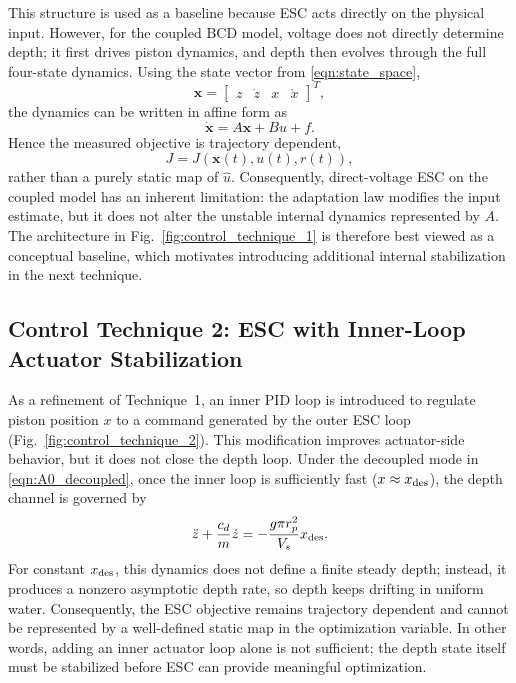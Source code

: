 ﻿\documentclass[subscriptcorrection,upint,varvw,barcolor=Goldenrod3,mathalfa=cal=euler,balance,hyphenate,french,pdf-a]{asmejour}
\begin{document}
This structure is used as a baseline because ESC acts directly on the physical input. However, for the coupled BCD model, voltage does not directly determine depth; it first drives piston dynamics, and depth then evolves through the full four-state dynamics. Using the state vector from \eqref{eqn:state_space},
\[
\mathbf{x}=\begin{bmatrix}z & \dot{z} & x & \dot{x}\end{bmatrix}^T,
\]
the dynamics can be written in affine form as
\[
\dot{\mathbf{x}}=A\mathbf{x}+Bu+f.
\]
Hence the measured objective is trajectory dependent,
\[
J=J(\mathbf{x}(t),u(t),r(t)),
\]
rather than a purely static map of $\hat{u}$. Consequently, direct-voltage ESC on the coupled model has an inherent limitation: the adaptation law modifies the input estimate, but it does not alter the unstable internal dynamics represented by $A$. The architecture in Fig.~\ref{fig:control_technique_1} is therefore best viewed as a conceptual baseline, which motivates introducing additional internal stabilization in the next technique.

\subsection{Control Technique 2: ESC with Inner-Loop Actuator Stabilization}
As a refinement of Technique~1, an inner PID loop is introduced to regulate piston position $x$ to a command generated by the outer ESC loop (Fig.~\ref{fig:control_technique_2}). This modification improves actuator-side behavior, but it does not close the depth loop. Under the decoupled mode in \eqref{eqn:A0_decoupled}, once the inner loop is sufficiently fast ($x\approx x_{\rm des}$), the depth channel is governed by
\[
\ddot{z}+\frac{c_d}{m}\dot{z}=-\frac{g\pi r_p^2}{V_s}x_{\rm des}.
\]
For constant $x_{\rm des}$, this dynamics does not define a finite steady depth; instead, it produces a nonzero asymptotic depth rate, so depth keeps drifting in uniform water. Consequently, the ESC objective remains trajectory dependent and cannot be represented by a well-defined static map in the optimization variable. In other words, adding an inner actuator loop alone is not sufficient; the depth state itself must be stabilized before ESC can provide meaningful optimization.
\end{document}
